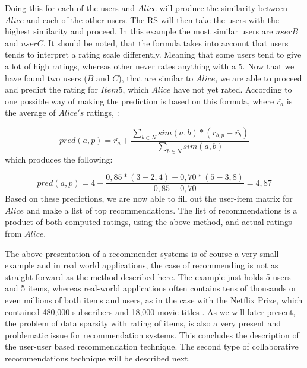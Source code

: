 Doing this for each of the users and \(Alice\) will produce the similarity between \(Alice\) and each of the other users. The RS will then take the users with the highest similarity and proceed. In this example the most similar users are \(userB\) and \(userC\). It should be noted, that the formula takes into account that users tends to interpret a rating scale differently. Meaning that some users tend to give a lot of high ratings, whereas other never rates anything with a 5\citep[p. 15]{IntroductionRecommenderSystems}.\newline 
Now that we have found two users (\(B\) and \(C\)), that are similar to \(Alice\), we are able to proceed and predict the rating for \(Item5\), which \(Alice\) have not yet rated. According to \citet[p. 16]{IntroductionRecommenderSystems} one possible way of making the prediction is based on this formula, where $\bar{r_{a}}$ is the average of \(Alice's\) ratings,  :\newline

\[
	pred(a,p) = \bar{r_{a}} + \frac{\sum_{b\in N} sim(a,b) * (r_{b,p} - \bar{r_{b}})}{\sum_{b\in N} sim(a,b)}
\]
which produces the following: \newline

\[
	pred(a,p) = 4 + \frac{0,85*(3-2,4)+0,70*(5-3,8)}{0,85+0,70} = 4,87
\]
Based on these predictions, we are now able to fill out the user-item matrix for \(Alice\) and make a list of top recommendations. The list of recommendations is a product of both computed ratings, using the above method, and actual ratings from \(Alice\). \newline

The above presentation of a recommender systems is of course a very small example and in real world applications, the case of recommending is not as straight-forward as the method described here. The example just holds 5 users and 5 items, whereas real-world applications often contains tens of thousands or even millions of both items and users, as in the case with the Netflix Prize, which contained 480,000 subscribers and 18,000 movie titles \citep{NetflixPrize}. As we will later present, the problem of data sparsity with rating of items, is also a very present and problematic issue for recommendation systems.\newline
This concludes the description of the user-user based recommendation technique. The second type of collaborative recommendations technique will be described next.

